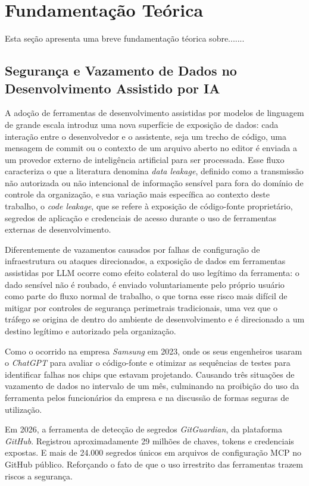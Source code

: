 \chapter{Fundamentação Teórica}\label{chp:fund}

Esta seção apresenta uma breve fundamentação téorica sobre.......

\section{Segurança e Vazamento de Dados no Desenvolvimento Assistido por IA}

A adoção de ferramentas de desenvolvimento assistidas por modelos de linguagem de grande escala introduz uma nova superfície de exposição de dados: cada interação entre o desenvolvedor e o assistente, seja um trecho de código, uma mensagem de commit ou o contexto de um arquivo aberto no editor é enviada a um provedor externo de inteligência artificial para ser processada. Esse fluxo caracteriza o que a literatura denomina \textit{data leakage}, definido como a transmissão não autorizada ou não intencional de informação sensível para fora do domínio de controle da organização, e sua variação mais específica ao contexto deste trabalho, o \textit{code leakage}, que se refere à exposição de código-fonte proprietário, segredos de aplicação e credenciais de acesso durante o uso de ferramentas externas de desenvolvimento.

Diferentemente de vazamentos causados por falhas de configuração de infraestrutura ou ataques direcionados, a exposição de dados em ferramentas assistidas por LLM ocorre como efeito colateral do uso legítimo da ferramenta: o dado sensível não é roubado, é enviado voluntariamente pelo próprio usuário como parte do fluxo normal de trabalho, o que torna esse risco mais difícil de mitigar por controles de segurança perimetrais tradicionais, uma vez que o tráfego se origina de dentro do ambiente de desenvolvimento e é direcionado a um destino legítimo e autorizado pela organização.

Como o ocorrido na empresa \textit{Samsung} em 2023, onde os seus engenheiros usaram o \textit{ChatGPT} para avaliar o código-fonte e otimizar as sequências de testes para identificar falhas nos chips que estavam projetando. Causando três situações de vazamento de dados no intervalo de um mês, culminando na proibição do uso da ferramenta pelos funcionários da empresa e na discussão de formas seguras de utilização.

Em 2026, a ferramenta de detecção de segredos \textit{GitGuardian}, da plataforma \textit{GitHub}. Registrou aproximadamente 29 milhões de chaves, tokens e credenciais expostas. E mais de 24.000 segredos únicos em arquivos de configuração MCP no GitHub público. Reforçando o fato de que o uso irrestrito das ferramentas trazem riscos a segurança. 


